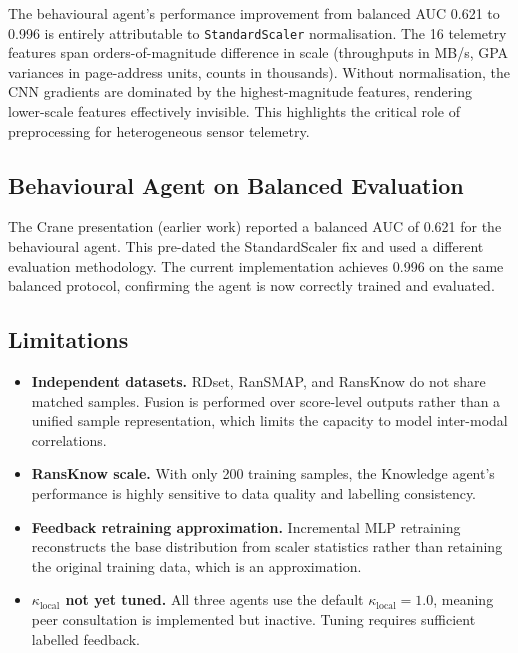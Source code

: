 \documentclass[12pt,a4paper]{article}
\begin{document}
The behavioural agent's performance improvement from balanced AUC 0.621 to 0.996 is
entirely attributable to \texttt{StandardScaler} normalisation. The 16 telemetry
features span orders-of-magnitude difference in scale (throughputs in MB/s, GPA
variances in page-address units, counts in thousands). Without normalisation, the CNN
gradients are dominated by the highest-magnitude features, rendering lower-scale
features effectively invisible. This highlights the critical role of preprocessing for
heterogeneous sensor telemetry.

\subsection{Behavioural Agent on Balanced Evaluation}

The Crane presentation (earlier work) reported a balanced AUC of 0.621 for the
behavioural agent. This pre-dated the StandardScaler fix and used a different
evaluation methodology. The current implementation achieves 0.996 on the same balanced
protocol, confirming the agent is now correctly trained and evaluated.

\subsection{Limitations}

\begin{itemize}[leftmargin=2em]
  \item \textbf{Independent datasets.} RDset, RanSMAP, and RansKnow do not share
    matched samples. Fusion is performed over score-level outputs rather than a
    unified sample representation, which limits the capacity to model inter-modal
    correlations.
  \item \textbf{RansKnow scale.} With only 200 training samples, the Knowledge agent's
    performance is highly sensitive to data quality and labelling consistency.
  \item \textbf{Feedback retraining approximation.} Incremental MLP retraining
    reconstructs the base distribution from scaler statistics rather than retaining the
    original training data, which is an approximation.
  \item \textbf{$\kappa_{\text{local}}$ not yet tuned.} All three agents use the default
    $\kappa_{\text{local}} = 1.0$, meaning peer consultation is implemented but
    inactive. Tuning requires sufficient labelled feedback.
\end{itemize}
\end{document}
